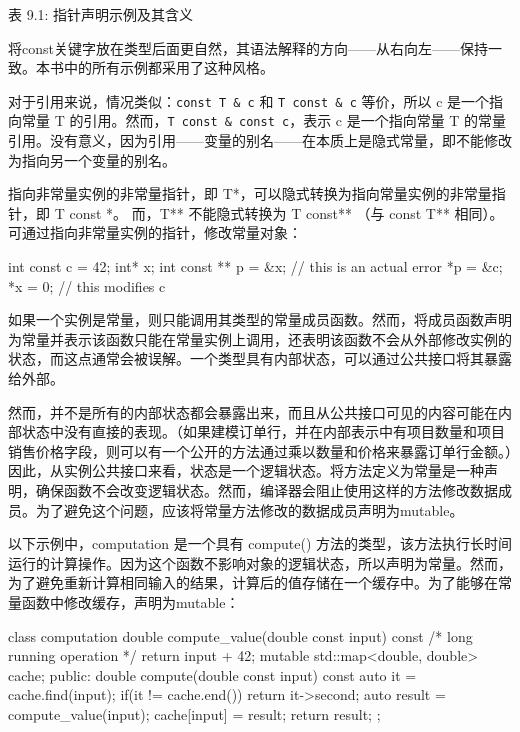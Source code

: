\begin{center}
表 9.1: 指针声明示例及其含义
\end{center}

\begin{myNotic}
将const关键字放在类型后面更自然，其语法解释的方向——从右向左——保持一致。本书中的所有示例都采用了这种风格。
\end{myNotic}

对于引用来说，情况类似：\verb|const T & c| 和 \verb|T const & c| 等价，所以 c 是一个指向常量 T 的引用。然而，\verb|T const & const c|，表示 c 是一个指向常量 T 的常量引用。没有意义，因为引用——变量的别名——在本质上是隐式常量，即不能修改为指向另一个变量的别名。

指向非常量实例的非常量指针，即 T*，可以隐式转换为指向常量实例的非常量指针，即 T const *。 而，T** 不能隐式转换为 T const** （与 const T** 相同）。可通过指向非常量实例的指针，修改常量对象：

\begin{cpp}
int const c = 42;
int* x;
int const ** p = &x; // this is an actual error
*p = &c;
*x = 0;              // this modifies c
\end{cpp}

如果一个实例是常量，则只能调用其类型的常量成员函数。然而，将成员函数声明为常量并表示该函数只能在常量实例上调用，还表明该函数不会从外部修改实例的状态，而这点通常会被误解。一个类型具有内部状态，可以通过公共接口将其暴露给外部。

然而，并不是所有的内部状态都会暴露出来，而且从公共接口可见的内容可能在内部状态中没有直接的表现。（如果建模订单行，并在内部表示中有项目数量和项目销售价格字段，则可以有一个公开的方法通过乘以数量和价格来暴露订单行金额。）因此，从实例公共接口来看，状态是一个逻辑状态。将方法定义为常量是一种声明，确保函数不会改变逻辑状态。然而，编译器会阻止使用这样的方法修改数据成员。为了避免这个问题，应该将常量方法修改的数据成员声明为mutable。

以下示例中，computation 是一个具有 compute() 方法的类型，该方法执行长时间运行的计算操作。因为这个函数不影响对象的逻辑状态，所以声明为常量。然而，为了避免重新计算相同输入的结果，计算后的值存储在一个缓存中。为了能够在常量函数中修改缓存，声明为mutable：

\begin{cpp}
class computation
{
    double compute_value(double const input) const
    {
        /* long running operation */
        return input + 42;
    }
    mutable std::map<double, double> cache;
public:
    double compute(double const input) const
    {
        auto it = cache.find(input);
        if(it != cache.end()) return it->second;
        auto result = compute_value(input);
        cache[input] = result;
        return result;
    }
};
\end{cpp}

